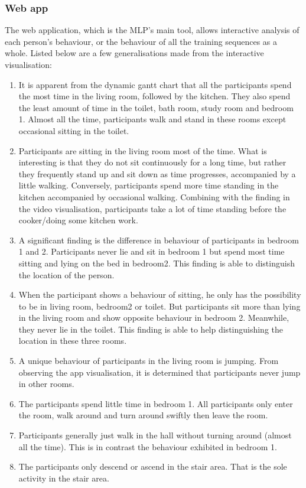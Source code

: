 \documentclass[fleqn,10pt]{SelfArx} %
\begin{document}
\subsubsection{Web app}
The web application, which is the MLP’s main tool, allows interactive analysis of each person’s behaviour, or the behaviour of all the training sequences as a whole. Listed below are a few generalisations made from the interactive visualisation:
\begin{enumerate}
\item It is apparent from the dynamic gantt chart that all the participants spend the most time in the living room, followed by the kitchen. They also spend the least amount of time in the toilet, bath room, study room and bedroom 1. Almost all the time, participants walk and stand in these rooms except occasional sitting in the toilet. 
\item Participants are sitting in the living room most of the time. What is interesting is that they do not sit continuously for a long time, but rather they frequently stand up and sit down as time progresses, accompanied by a little walking. Conversely, participants spend more time standing in the kitchen accompanied by occasional walking. Combining with the finding in the video visualisation, participants take a lot of time standing before the cooker/doing some kitchen work.
\item A significant finding is the difference in behaviour of participants in bedroom 1 and 2. Participants never lie and sit in bedroom 1 but spend most time sitting and lying on the bed in bedroom2. This finding is able to distinguish the location of the person.
\item When the participant shows a behaviour of sitting, he only has the possibility to be in living room, bedroom2 or toilet. But participants sit more than lying in the living room and show opposite behaviour in bedroom 2. Meanwhile, they never lie in the toilet. This finding is able to help distinguishing the location in these three rooms.  
\item  A unique behaviour of participants in the living room is jumping. From observing the app visualisation, it is determined that participants never jump in other rooms.
\item The participants spend little time in bedroom 1. All participants only enter the room, walk around and turn around swiftly then leave the room.
\item Participants generally just walk in the hall without turning around (almost all the time). This is in contrast the behaviour exhibited in bedroom 1.
\item The participants only descend or ascend in the stair area. That is  the sole activity in the stair area.
\end{enumerate}
\end{document}
